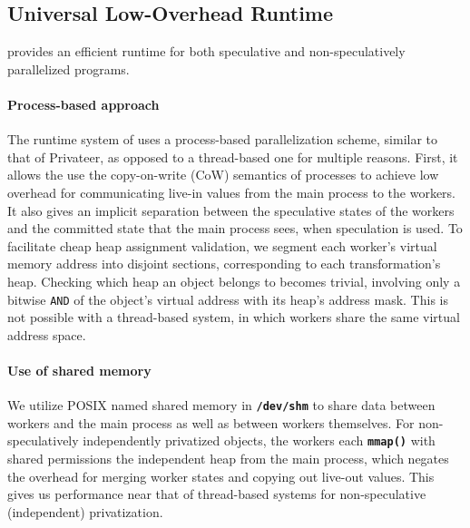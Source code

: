 \subsection{Universal Low-Overhead Runtime}

\name provides an efficient runtime
for both speculative and non-speculatively parallelized programs.

\paragraph{Process-based approach}
The runtime system of \name uses a process-based parallelization scheme,
similar to that of Privateer, as opposed to a thread-based one for multiple
reasons. First, it allows the use the copy-on-write (CoW) semantics of
processes to achieve low overhead for communicating live-in values from the
main process to the workers.
It also gives an implicit separation between the speculative states of the
workers and the committed state that the main process sees, when
speculation is used. To facilitate cheap heap assignment validation, we
segment each worker's virtual memory address into disjoint sections,
corresponding to each transformation's heap. Checking which heap an object
belongs to becomes trivial, involving only a bitwise \texttt{AND} of the
object's virtual address with its heap's address mask.
This is not possible
with a thread-based system, in which workers share the same virtual address
space.

\paragraph{Use of shared memory}
We utilize POSIX named shared memory in \texttt{\textbf{/dev/shm}} to share
data between workers and the main process as well as between workers
themselves.
For non-speculatively independently privatized objects, the workers
each \texttt{\textbf{mmap()}} with shared permissions the independent heap
from the main process, which negates the overhead for merging worker states
and copying out live-out values. This gives us performance near that of
thread-based systems for non-speculative (independent) privatization.


